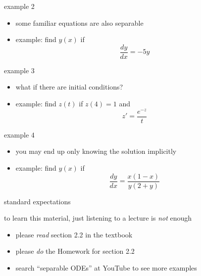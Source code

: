 \documentclass{beamer}
\begin{document}
\begin{frame}{example 2}
\begin{itemize}
\item some familiar equations are also separable
\item example: find $y(x)$ if
    $$\frac{dy}{dx} = - 5 y$$
\end{itemize}

\vspace{50mm}
\end{frame}


\begin{frame}{example 3}
\begin{itemize}
\item what if there are initial conditions?
\item example: find $z(t)$ if $z(4)=1$ and
    $$z' = \frac{e^{-z}}{t}$$
\end{itemize}

\vspace{50mm}
\end{frame}


\begin{frame}{example 4}
\begin{itemize}
\item you may end up only knowing the solution implicitly
\item example: find $y(x)$ if
    $$\frac{dy}{dx} = \frac{x(1-x)}{y(2+y)}$$
\end{itemize}

\vspace{50mm}
\end{frame}


\begin{frame}{standard expectations}

to learn this material, just listening to a lecture is \emph{not} enough
\begin{itemize}
\item please \emph{read} section 2.2 in the textbook
\item please \emph{do} the Homework for section 2.2
\item search ``separable ODEs'' at YouTube to see more examples
\end{itemize}
\end{frame}
\end{document}
